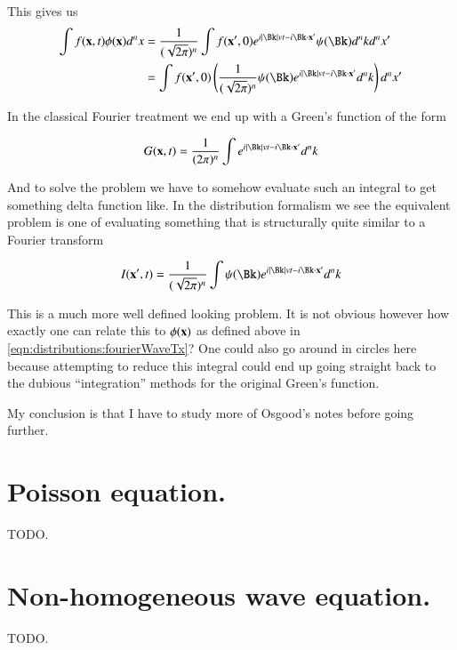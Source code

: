This gives us
\begin{align*}
\int {f}(\Bx,t) \phi(\Bx) d^n x 
&= \frac{1}{(\sqrt{2\pi})^n} \int {f}(\Bx',0) e^{i \Abs{\Bk} v t - i \Bk \cdot \Bx' } \psi(\Bk) d^n k d^n x' \\
&= 
\int {f}(\Bx',0) \left( \frac{1}{(\sqrt{2\pi})^n} \psi(\Bk) e^{i \Abs{\Bk} v t - i \Bk \cdot \Bx' } d^n k 
\right) d^n x' \\
\end{align*}

In the classical Fourier treatment we end up with a Green's function of the form

\begin{align*}
G(\Bx, t) = \frac{1}{({2\pi})^n} \int e^{i \Abs{\Bk} v t - i \Bk \cdot \Bx' } d^n k 
\end{align*}

And to solve the problem we have to somehow evaluate such an integral to get something delta function like.  In the distribution
formalism we see the equivalent problem is one of evaluating something that is structurally quite similar to
a Fourier transform

\begin{align*}
I(\Bx', t) = \frac{1}{(\sqrt{2\pi})^n} \int \psi(\Bk) e^{i \Abs{\Bk} v t - i \Bk \cdot \Bx' } d^n k 
\end{align*}

This is a much more well defined looking problem.  It is not obvious however how exactly one can relate this to $\phi(\mathbf{x})$ as defined above in \ref{eqn:distributions:fourierWaveTx}?  One could also go around in circles here because attempting to reduce this integral could end up going straight back to the dubious ``integration'' methods for the original Green's function.

My conclusion is that I have to study more of Osgood's notes before going further.

\section{Poisson equation. }

TODO.

\section{Non-homogeneous wave equation. }

TODO.

%
%

%

